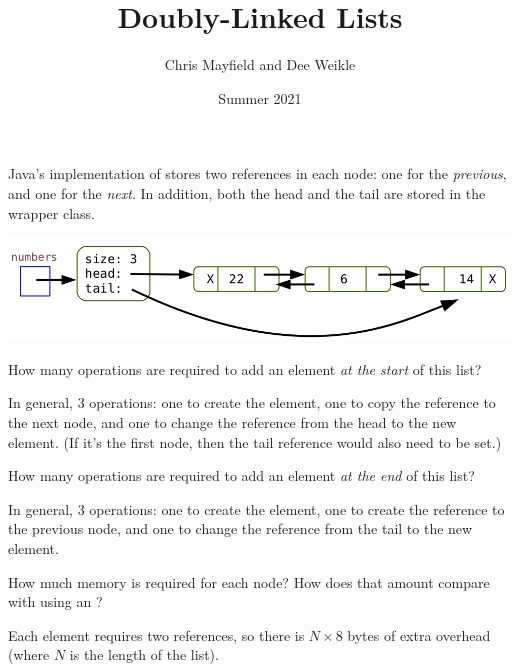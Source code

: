 \documentclass[12pt]{article}
\title{Doubly-Linked Lists}
\author{Chris Mayfield and Dee Weikle}
\date{Summer 2021}
\begin{document}
\maketitle



Java's implementation of  stores two references in each node: one for the {\it previous}, and one for the {\it next}.
In addition, both the head and the tail are stored in the wrapper class.

\begin{center}
\includegraphics[scale=0.35]{doubly-linked.png}
\end{center}




\Q How many operations are required to add an element {\it at the start} of this list?

\begin{answer}
In general, 3 operations: one to create the element, one to copy the reference to the next node, and one to change the reference from the head to the new element.
(If it's the first node, then the tail reference would also need to be set.)
\end{answer}

\Q How many operations are required to add an element {\it at the end} of this list?

\begin{answer}
In general, 3 operations: one to create the element, one to create the reference to the previous node, and one to change the reference from the tail to the new element.
\end{answer}

\Q How much memory is required for each node?
How does that amount compare with using an ?

\begin{answer}
Each element requires two references, so there is $N \times 8$ bytes of extra overhead (where $N$ is the length of the list).
\end{answer}
\end{document}
